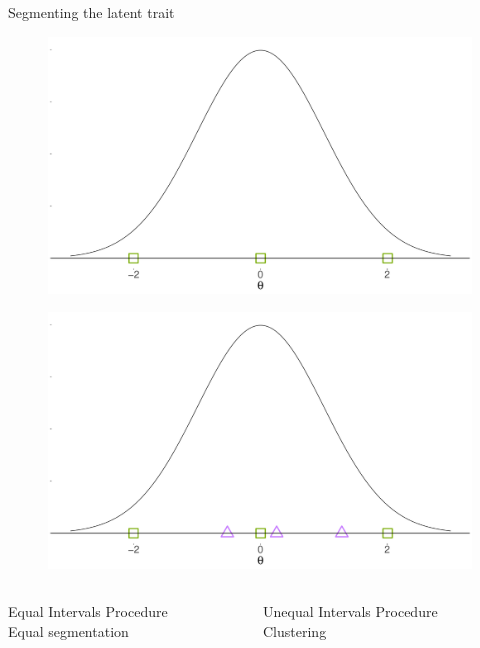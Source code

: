 \documentclass{beamer} %
\begin{document}
	
\begin{frame}{Segmenting the latent trait}
	\vspace*{-3mm}
	\begin{overprint}
		\begin{figure}
			\centering
			\includegraphics[width=.80\linewidth]{eip}
		\end{figure}
		\begin{figure}
			\centering
			\includegraphics[width=.80\linewidth]{latent}
		\end{figure}
	\end{overprint}

\begin{columns}[T]
	\begin{column}{.50\linewidth}
		\begin{center}
			\textcolor{eip}{Equal Intervals Procedure}\\
			\small Equal segmentation
		\end{center}
	\end{column}
	\begin{column}{.50\linewidth}
	\begin{center}
		\textcolor{uip}{Unequal Intervals Procedure}\\
		\small Clustering
	\end{center}
\end{column}
\end{columns}
	
\end{frame}
\end{document}
